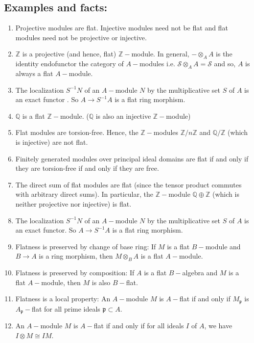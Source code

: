 \documentclass[12pt]{article}
\theoremstyle{mytheoremstyle}
\newcommand{\bZ}{\mathbb{Z}}
\newcommand{\bQ}{\mathbb{Q}}
\newcommand{\cS}{\mathcal{S}}
\begin{document}
\subsection*{Examples and facts:}
\begin{enumerate}
    \item Projective modules are flat. Injective modules need not be flat
        and flat modules need not be projective or injective.
    \item $\mathbb{Z}$ is a projective (and hence, flat) $\bZ-$module.
        In general, $-\otimes_A A$ is the identity endofunctor
        the category of $A-$modules
        i.e. $\cS\otimes_A A = \cS$ and so,
        $A$ is always a flat $A-$module.
    \item The localization $S^{-1}N$ of an $A-$module $N$ by the multiplicative
        set $S$ of $A$ is an exact functor . So $A\to S^{-1}A$ is a flat ring
        morphism.
    \item $\bQ$ is a flat $\bZ-$module. ($\bQ$ is also an injective
        $\bZ-$module)
    \item Flat modules are torsion-free. Hence, the $\bZ-$modules
        $\bZ/n\bZ$ and $\bQ/\bZ$ (which is injective) are not flat.
    \item Finitely generated modules over principal ideal domains are
        flat if and only if they are torsion-free if and only if they
        are free.
    \item The direct sum of flat modules are flat (since the tensor
        product commutes with arbitrary direct sums). In particular,
        the $\bZ-$module $\bQ\oplus\bZ$ (which is neither projective
        nor injective) is flat.
    \item The localization $S^{-1}N$ of an $A-$module $N$ by the multiplicative
        set $S$ of $A$ is an exact functor. So $A\to S^{-1}A$ is a flat ring
        morphism.
    \item Flatness is preserved by change of base ring:
        If $M$ is a flat $B-$module and $B\to A$ is a ring morphism,
        then $M\otimes_B A$ is a flat $A-$module.
    \item Flatness is preserved by composition:
        If $A$ is a flat $B-$algebra and $M$ is a flat $A-$module, then
        $M$ is also $B-$flat.
    \item Flatness is a local property:
        An $A-$module $M$ is $A-$flat if and only if $M_\mathfrak{p}$
        is $A_\mathfrak{p}-$flat for all prime ideals $\mathfrak{p}
        \subset A$.
    \item An $A-$module $M$ is $A-$flat if and only if for all ideals $I$
        of $A$, we have $I\otimes M\cong IM$.
\end{enumerate}
\end{document}
